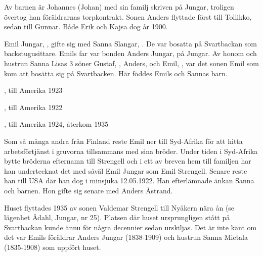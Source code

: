 Av barnen är Johannes (Johan) med sin familj skriven på Jungar, troligen övertog han föräldrarnas torpkontrakt. Sonen Anders flyttade först till Tollikko, sedan till Gunnar. Både Erik och Kajsa dog år 1900.





Emil Jungar, ,  gifte sig med Sanna Slangar, . De var bosatta på Svartbackan som backstugusittare. Emils far var bonden Anders Jungar,  på Jungar. Av honom och hustrun Sanna Lisas 3 söner Gustaf, , Anders,  och Emil, , var det sonen Emil som kom att bosätta sig på Svartbacken. Här föddes Emils och Sannas barn.
\begin{jhchildren}
  \item {}, till Amerika 1923
  \item {}, till Amerika 1922
  \item {}, till Amerika 1924, återkom 1935
\end{jhchildren}

Som så många andra från Finland reste Emil ner till Syd-Afrika för att hitta arbetsförtjänst i gruvorna tillsammans med sina bröder. Under tiden i Syd-Afrika bytte bröderna efternamn till Strengell och i ett av breven hem till familjen har han undertecknat det med såväl Emil Jungar som Emil Strengell. Senare reste han till USA där han dog i  minsjuka 12.05.1922. Han efterlämnade änkan Sanna och barnen. Hon gifte sig senare med Anders Åstrand.

Huset flyttades 1935 av sonen Valdemar Strengell till Nyåkern nära ån (se lägenhet Ådahl, Jungar, nr 25). Platsen där huset ursprungligen stått på Svartbackan kunde ännu för några decennier sedan urskiljas. Det är inte känt om det var Emils föräldrar Anders Jungar (1838-1909) och hustrun Sanna \textborn Mietala (1835-1908) som uppfört huset.
